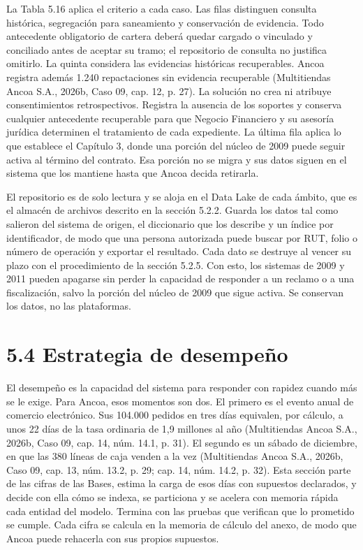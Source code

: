 \documentclass[11pt]{article}
\begin{document}
La Tabla 5.16 aplica el criterio a cada caso. Las filas distinguen consulta histórica, segregación para saneamiento y conservación de evidencia. Todo antecedente obligatorio de cartera deberá quedar cargado o vinculado y conciliado antes de aceptar su tramo; el repositorio de consulta no justifica omitirlo. La quinta considera las evidencias históricas recuperables. Ancoa registra además 1.240 repactaciones sin evidencia recuperable (Multitiendas Ancoa S.A., 2026b, Caso 09, cap. 12, p. 27). La solución no crea ni atribuye consentimientos retrospectivos. Registra la ausencia de los soportes y conserva cualquier antecedente recuperable para que Negocio Financiero y su asesoría jurídica determinen el tratamiento de cada expediente. La última fila aplica lo que establece el Capítulo 3, donde una porción del núcleo de 2009 puede seguir activa al término del contrato. Esa porción no se migra y sus datos siguen en el sistema que los mantiene hasta que Ancoa decida retirarla.

El repositorio es de solo lectura y se aloja en el Data Lake de cada ámbito, que es el almacén de archivos descrito en la sección 5.2.2. Guarda los datos tal como salieron del sistema de origen, el diccionario que los describe y un índice por identificador, de modo que una persona autorizada puede buscar por RUT, folio o número de operación y exportar el resultado. Cada dato se destruye al vencer su plazo con el procedimiento de la sección 5.2.5. Con esto, los sistemas de 2009 y 2011 pueden apagarse sin perder la capacidad de responder a un reclamo o a una fiscalización, salvo la porción del núcleo de 2009 que sigue activa. Se conservan los datos, no las plataformas.


\section{5.4 Estrategia de desempeño}

El desempeño es la capacidad del sistema para responder con rapidez cuando más se le exige. Para Ancoa, esos momentos son dos. El primero es el evento anual de comercio electrónico. Sus 104.000 pedidos en tres días equivalen, por cálculo, a unos 22 días de la tasa ordinaria de 1,9 millones al año (Multitiendas Ancoa S.A., 2026b, Caso 09, cap. 14, núm. 14.1, p. 31). El segundo es un sábado de diciembre, en que las 380 líneas de caja venden a la vez (Multitiendas Ancoa S.A., 2026b, Caso 09, cap. 13, núm. 13.2, p. 29; cap. 14, núm. 14.2, p. 32). Esta sección parte de las cifras de las Bases, estima la carga de esos días con supuestos declarados, y decide con ella cómo se indexa, se particiona y se acelera con memoria rápida cada entidad del modelo. Termina con las pruebas que verifican que lo prometido se cumple. Cada cifra se calcula en la memoria de cálculo del anexo, de modo que Ancoa puede rehacerla con sus propios supuestos.
\end{document}

